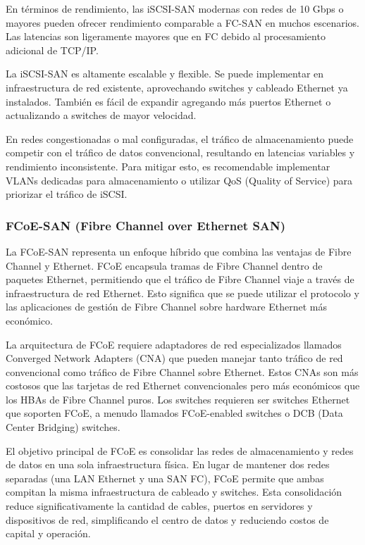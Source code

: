 En términos de rendimiento, las iSCSI-SAN modernas con redes de 10 Gbps o mayores pueden ofrecer rendimiento comparable a FC-SAN en muchos escenarios. Las latencias son ligeramente mayores que en FC debido al procesamiento adicional de TCP/IP.

La iSCSI-SAN es altamente escalable y flexible. Se puede implementar en infraestructura de red existente, aprovechando switches y cableado Ethernet ya instalados. También es fácil de expandir agregando más puertos Ethernet o actualizando a switches de mayor velocidad.

En redes congestionadas o mal configuradas, el tráfico de almacenamiento puede competir con el tráfico de datos convencional, resultando en latencias variables y rendimiento inconsistente. Para mitigar esto, es recomendable implementar VLANs dedicadas para almacenamiento o utilizar QoS (Quality of Service) para priorizar el tráfico de iSCSI.

\subsubsection{FCoE-SAN (Fibre Channel over Ethernet SAN)}

La FCoE-SAN representa un enfoque híbrido que combina las ventajas de Fibre Channel y Ethernet. FCoE encapsula tramas de Fibre Channel dentro de paquetes Ethernet, permitiendo que el tráfico de Fibre Channel viaje a través de infraestructura de red Ethernet. Esto significa que se puede utilizar el protocolo y las aplicaciones de gestión de Fibre Channel sobre hardware Ethernet más económico.

La arquitectura de FCoE requiere adaptadores de red especializados llamados Converged Network Adapters (CNA) que pueden manejar tanto tráfico de red convencional como tráfico de Fibre Channel sobre Ethernet. Estos CNAs son más costosos que las tarjetas de red Ethernet convencionales pero más económicos que los HBAs de Fibre Channel puros. Los switches requieren ser switches Ethernet que soporten FCoE, a menudo llamados FCoE-enabled switches o DCB (Data Center Bridging) switches.

El objetivo principal de FCoE es consolidar las redes de almacenamiento y redes de datos en una sola infraestructura física. En lugar de mantener dos redes separadas (una LAN Ethernet y una SAN FC), FCoE permite que ambas compitan la misma infraestructura de cableado y switches. Esta consolidación reduce significativamente la cantidad de cables, puertos en servidores y dispositivos de red, simplificando el centro de datos y reduciendo costos de capital y operación.

